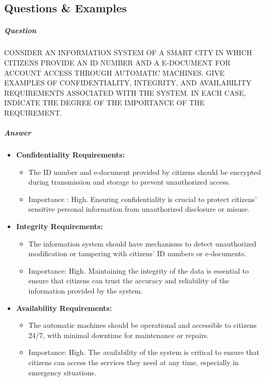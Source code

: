 \documentclass{article}
\begin{document}
                        \subsection{Questions \& Examples}
                        \subparagraph{Question}
                        CONSIDER AN INFORMATION SYSTEM OF A SMART CITY IN WHICH CITIZENS
                        PROVIDE AN ID NUMBER AND A E-DOCUMENT FOR ACCOUNT ACCESS
                        THROUGH AUTOMATIC MACHINES.
                        GIVE EXAMPLES OF CONFIDENTIALITY, INTEGRITY, AND AVAILABILITY
                        REQUIREMENTS ASSOCIATED WITH THE SYSTEM. IN EACH CASE, INDICATE
                        THE DEGREE OF THE IMPORTANCE OF THE REQUIREMENT.
                        \subparagraph{Answer}
                        \begin{itemize}
                            \item  \textbf{Confidentiality Requirements:}
                            \begin{itemize}
                                \item The ID number and e-document provided by citizens should be encrypted during transmission and storage to prevent unauthorized access.
                                \item Importance : High. Ensuring confidentiality is crucial to protect citizens' sensitive personal information from unauthorized disclosure or misuse.
                            \end{itemize}
                            \item   \textbf{Integrity Requirements:}
                            \begin{itemize}
                                \item The information system should have mechanisms to detect unauthorized modification or tampering with citizens' ID numbers or e-documents.
                                \item Importance: High. Maintaining the integrity of the data is essential to ensure that citizens can trust the accuracy and reliability of the information provided by the system.
                            \end{itemize}
                            \item  \textbf{Availability Requirements:}
                            \begin{itemize}
                                \item The automatic machines should be operational and accessible to citizens 24/7, with minimal downtime for maintenance or repairs.
                                \item Importance: High. The availability of the system is critical to ensure that citizens can access the services they need at any time, especially in emergency situations.
                            \end{itemize}    
                        \end{itemize}
\end{document}
